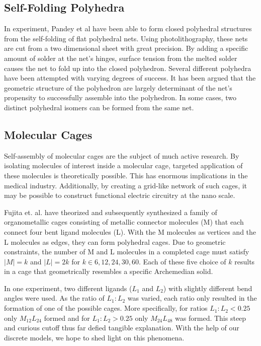 \documentclass[12pt]{article}
\begin{document}
\subsection{Self-Folding Polyhedra}

In experiment, Pandey et al have been able to form closed polyhedral structures from the self-folding of flat polyhedral nets. Using photolithography, these nets are cut from a two dimensional sheet with great precision. By adding a specific amount of solder at the net's hinges, surface tension from the melted solder causes the net to fold up into the closed polyhedron. Several different polyhedra have been attempted with varying degrees of success. It has been argued that the geometric structure of the polyhedron are largely determinant of the net's propensity to successfully assemble into the polyhedron. In some cases, two distinct polyhedral isomers can be formed from the same net.

\subsection{Molecular Cages}

Self-assembly of molecular cages are the subject of much active research. By isolating molecules of interest inside a molecular cage, targeted application of these molecules is theoretically possible. This has enormous implications in the medical industry. Additionally, by creating a grid-like network of such cages, it may be possible to construct functional electric circuitry at the nano scale. 

Fujita et. al. have theorized and subsequently synthesized a family of organometallic cages consisting of metallic connector molecules (M) that each connect four bent ligand molecules (L). With the M molecules as vertices and the L molecules as edges, they can form polyhedral cages. Due to geometric constraints, the number of M and L molecules in  a completed cage must satisfy  $|M| = k$ and $|L| = 2k$ for $k \in 6, 12, 24, 30, 60$. Each of these five choice of $k$ results in a cage that geometrically resembles a specific Archemedian solid. 

In one experiment, two different ligands ($L_1$ and $L_2$) with slightly different bend angles were used. As the ratio of $L_1:L_2$ was varied, each ratio only resulted in the formation of one of the possible cages. More specifically, for ratios $L_1:L_2 < 0.25$ only $M_{12}L_{24}$ formed and for  $L_1:L_2 > 0.25$ only $M_{24}L_{48}$ was formed. This steep and curious cutoff thus far defied tangible explanation. With the help of our discrete models, we hope to shed light on this phenomena. 
\end{document}
